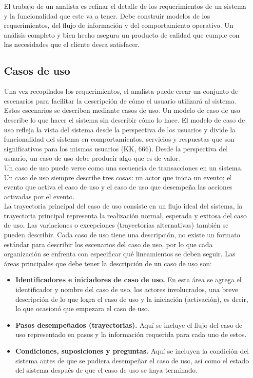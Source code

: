 El trabajo de un analista es refinar el detalle de los requerimientos de un sistema y la funcionalidad que este va a tener. Debe construir modelos de los requerimientos, del flujo de información y del comportamiento operativo. Un análisis completo
y bien hecho asegura un producto de calidad que cumple con las necesidades que el cliente desea satisfacer. \\

\subsection{Casos de uso}
Una vez recopilados los requerimientos, el analista puede crear un conjunto de escenarios para facilitar la descripción de cómo el usuario utilizará al sistema. Estos escenarios se describen mediante casos de uso. Un modelo de caso de uso 
describe lo que hacer el sistema sin describir cómo lo hace. El modelo de caso de uso refleja la vista del sistema desde la perspectiva de los usuarios y divide la funcionalidad del sistema en comportamientos, servicios y respuestas que son 
significativos para los mismos usuarios (KK, 666). Desde la perspectiva del usuario, un caso de uso debe producir algo que es de valor.\\

Un caso de uso puede verse como una secuencia de transacciones en un sistema. Un caso de uso siempre describe tres cosas: un actor que inicia un evento; el evento que activa el caso de uso y el caso de uso que desempeña las acciones activadas
por el evento.\\

La trayectoria principal del caso de uso consiste en un flujo ideal del sistema, la trayectoria principal representa la realización normal, esperada y exitosa del caso de uso. Las variaciones o excepciones (trayectorias alternativas) también 
se pueden describir. Cada caso de uso tiene una descripción, no existe un formato estándar para describir los escenarios del caso de uso, por lo que cada organización se enfrenta con especificar qué lineamientos se deben seguir. Las áreas principales 
que debe tener la descripción de un caso de uso son:
\begin{itemize}
 \item {\bf Identificadores e iniciadores de caso de uso.} En esta área se agrega el identificador y nombre del caso de uso, los actores involucrados, una breve descripción de lo que logra el caso de uso y la iniciación (activación), es decir, lo que ocasionó que empezara el caso de uso.
 \item {\bf Pasos desempeñados (trayectorias).} Aquí se incluye el flujo del caso de uso representado en pasos y la información requerida para cada uno de estos.
 \item {\bf Condiciones, suposiciones y preguntas.} Aquí se incluyen la condición del sistema antes de que se pudiera desempeñar el caso de uso, así como el estado del sistema después de que el caso de uso se haya terminado.
\end{itemize}

